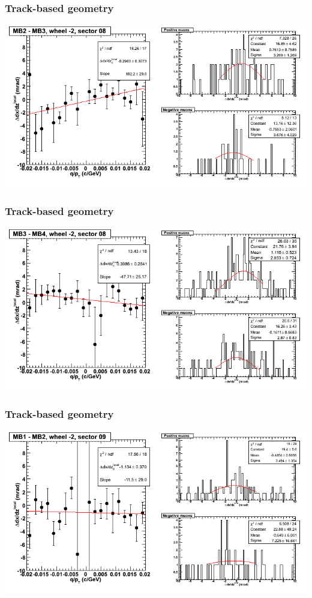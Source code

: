 \documentclass[compress]{beamer}
\begin{document}
\begin{frame}
\frametitle{Track-based geometry}
\includegraphics[width=\linewidth]{NOV4_segdiffs/dt13_slope_A_08_23.png}
\end{frame}

\begin{frame}
\frametitle{Track-based geometry}
\includegraphics[width=\linewidth]{NOV4_segdiffs/dt13_slope_A_08_34.png}
\end{frame}

\begin{frame}
\frametitle{Track-based geometry}
\includegraphics[width=\linewidth]{NOV4_segdiffs/dt13_slope_A_09_12.png}
\end{frame}
\end{document}
